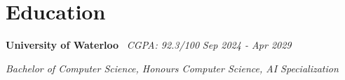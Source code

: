 \section{Education}

    \hspace{0.5em} \textbf{University of Waterloo} \textbar\ \textit{CGPA: 92.3/100} \hfill \textit{Sep 2024 - Apr 2029}

    \hspace{0.5em} \textit{Bachelor of Computer Science, Honours Computer Science, AI Specialization}

    \vspace{0.10 cm}
